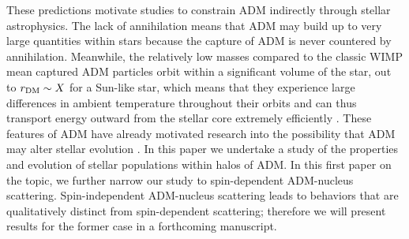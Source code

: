 \documentclass[useAMS,usenatbib]{mnras}
\begin{document}
  
  These predictions motivate studies to 
  constrain ADM indirectly through stellar astrophysics. The lack of 
  annihilation means that ADM may build up to very large
  quantities within stars because the capture of ADM is never countered 
  by annihilation. Meanwhile, the relatively low masses 
  compared to the classic WIMP mean captured ADM particles orbit within 
  a significant volume of the star, out to $r_{\mathrm{DM}} \sim X$  
  for a Sun-like star, which means that they experience large differences 
  in ambient temperature 
  throughout their orbits and can thus transport energy outward from the 
  stellar core extremely efficiently \citep{Spergel1985EffectInterior}. 
  These features of ADM have already motivated research into the possibility that 
  ADM may alter stellar evolution 
  \citep[e.g.][]{Zentner2011AsymmetricDwarfs,iocco_etal12,vincent_etal15}.
  In this paper we undertake a study of the properties and evolution of 
  stellar populations within halos of ADM. In this first paper on the topic, 
  we further narrow our study to spin-dependent ADM-nucleus scattering. 
  Spin-independent ADM-nucleus scattering leads to behaviors that are 
  qualitatively distinct from spin-dependent scattering; therefore we will 
  present results for the former case in a forthcoming manuscript. 
\end{document}
